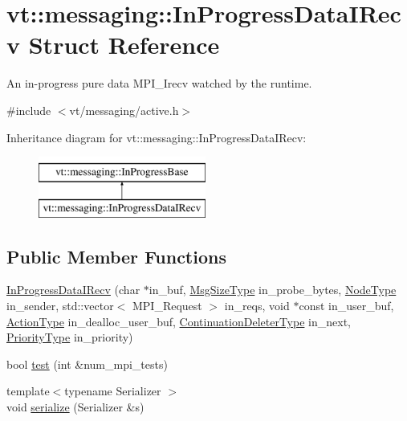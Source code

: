 \hypertarget{structvt_1_1messaging_1_1_in_progress_data_i_recv}{}\section{vt\+:\+:messaging\+:\+:In\+Progress\+Data\+I\+Recv Struct Reference}
\label{structvt_1_1messaging_1_1_in_progress_data_i_recv}


An in-\/progress pure data M\+P\+I\+\_\+\+Irecv watched by the runtime.  




{\ttfamily \#include $<$vt/messaging/active.\+h$>$}

Inheritance diagram for vt\+:\+:messaging\+:\+:In\+Progress\+Data\+I\+Recv\+:\begin{figure}[H]
\begin{center}
\leavevmode
\includegraphics[height=2.000000cm]{structvt_1_1messaging_1_1_in_progress_data_i_recv}
\end{center}
\end{figure}
\subsection*{Public Member Functions}
\begin{DoxyCompactItemize}
\item 
\hyperlink{structvt_1_1messaging_1_1_in_progress_data_i_recv_af2bf74787f28b863c0dfc355d176d819}{In\+Progress\+Data\+I\+Recv} (char $\ast$in\+\_\+buf, \hyperlink{namespacevt_a408e86a8c7c89309b52907dc5a513924}{Msg\+Size\+Type} in\+\_\+probe\+\_\+bytes, \hyperlink{namespacevt_a866da9d0efc19c0a1ce79e9e492f47e2}{Node\+Type} in\+\_\+sender, std\+::vector$<$ M\+P\+I\+\_\+\+Request $>$ in\+\_\+reqs, void $\ast$const in\+\_\+user\+\_\+buf, \hyperlink{namespacevt_ae0a5a7b18cc99d7b732cb4d44f46b0f3}{Action\+Type} in\+\_\+dealloc\+\_\+user\+\_\+buf, \hyperlink{namespacevt_a6de3bd201e2a040be9362d9d24d1e446}{Continuation\+Deleter\+Type} in\+\_\+next, \hyperlink{namespacevt_a86bff9f556eb761b27fc8600d006ac04}{Priority\+Type} in\+\_\+priority)
\item 
bool \hyperlink{structvt_1_1messaging_1_1_in_progress_data_i_recv_a5d7e51732503e70a684f27a8c2985dc9}{test} (int \&num\+\_\+mpi\+\_\+tests)
\item 
{\footnotesize template$<$typename Serializer $>$ }\\void \hyperlink{structvt_1_1messaging_1_1_in_progress_data_i_recv_afa4efb5376b20b0acfc7e5d789818f49}{serialize} (Serializer \&s)
\end{DoxyCompactItemize}
